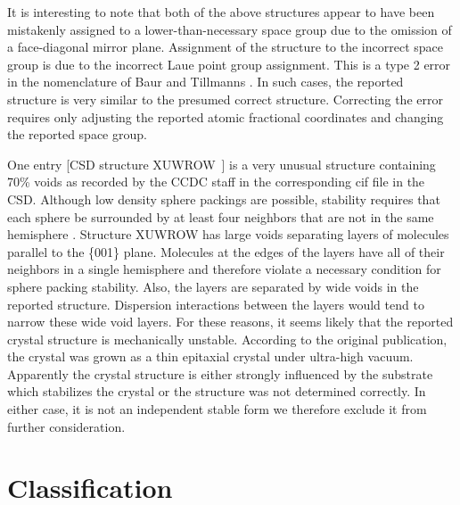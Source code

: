 \documentclass{iucr}              %
\begin{document}
It is interesting to note that both of the above structures appear to have been mistakenly assigned to a lower-than-necessary space group due to the omission of a face-diagonal mirror plane.  Assignment of the structure to the incorrect space group is due to the incorrect Laue point group assignment.  This is a type 2 error in the nomenclature of Baur and Tillmanns \cite{Baur86}.  In such cases, the reported structure is very similar to the presumed correct structure.  Correcting the error requires only adjusting the reported atomic fractional coordinates and changing the reported space group.

One entry [CSD structure XUWROW~\cite{Sung02}] is a very unusual structure containing 70\% voids as recorded by the CCDC staff in the corresponding cif file in the CSD.  Although low density sphere packings are possible, stability requires that each sphere be surrounded by at least four neighbors that are not in the same hemisphere \cite{Conway98}.  Structure XUWROW has large voids separating layers of molecules parallel to the \{001\} plane.  Molecules at the edges of the layers have all of their neighbors in a single hemisphere and therefore violate a necessary condition for sphere packing stability.  Also, the layers are separated by wide voids in the reported structure.  Dispersion interactions between the layers would tend to narrow these wide void layers.  For these reasons, it seems likely that the reported crystal structure is mechanically unstable.  According to the original publication, the crystal was grown as a thin epitaxial crystal under ultra-high vacuum.  Apparently the crystal structure is either strongly influenced by the substrate which stabilizes the crystal or the structure was not determined correctly.  In either case, it is not an independent stable form we therefore exclude it from further consideration.

\section{Classification}
\label{sec:Classification}
\end{document}
